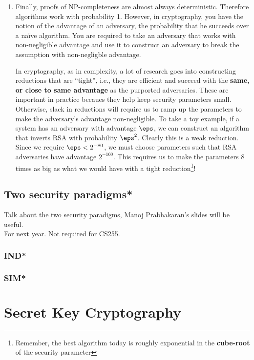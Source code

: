 \documentclass[A4, 11pt]{article}
\newcommand{\todo}[1]{\small{\sc #1}\normalsize}
\begin{document}
\begin{enumerate}
\item Finally, proofs of NP-completeness are almost always deterministic.
Therefore algorithms work with probability 1.  However, in cryptography,
you have the notion of the advantage of an adversary, the probability that
he succeeds over a na\"ive algorithm. You are required to take an adversary
that works with non-negligible advantage and use it to construct an
adversary to break the assumption with non-negligble advantage. 

In cryptography, as in complexity, a lot of research goes into constructing
reductions that are ``tight'', i.e., they are efficient and succeed with
the {\bf same, or close to same advantage} as the purported adversaries.
These are important in practice becaues they help keep security parameters
small. Otherwise, slack in reductions will require us to ramp up the
parameters to make the adversary's advantage non-negligible. To take a toy
example, if a system has an adversary with advantage $\eps$, we can
construct an algorithm that inverts RSA with probability $\eps^2$. Clearly
this is a weak reduction. Since we require $\eps<2^{-80}$, we must choose
parameters such that RSA adversaries have advantage $2^{-160}$. This
requires us to make the parameters 8 times as big as what we would have
with a tight reduction\footnote{Remember, the best algorithm today is
roughly exponential in the {\bf cube-root} of the security parameter}!

\end{enumerate}

\subsection{Two security paradigms*} \label{subsec:indsim}
\todo{Talk about the two security paradigms, Manoj Prabhakaran's slides
will be useful.}
\\

\todo{For next year. Not required for CS255.}

\subsubsection{IND*}
\subsubsection{SIM*}

\section{Secret Key Cryptography}
\end{document}
